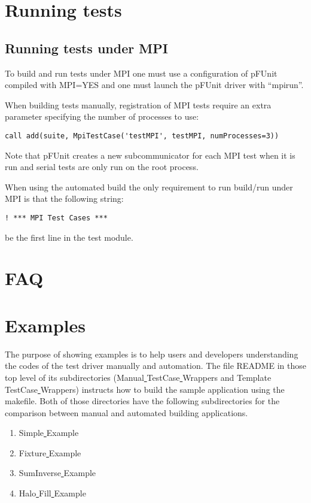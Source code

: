 \documentclass[10pt]{article}
\newcommand{\pfunit}{{\sc pFUnit }}
\begin{document}
\section{Running tests}
\subsection{Running tests under MPI}

To build and run tests under MPI one must use a configuration of
\pfunit compiled with MPI=YES and one must launch the \pfunit driver
with ``mpirun''.

When building tests manually, registration of MPI tests require an
extra parameter specifying the number of processes to use:

\begin{verbatim}
call add(suite, MpiTestCase('testMPI', testMPI, numProcesses=3))
\end{verbatim}

Note that \pfunit creates a new subcommunicator for each MPI test when it is run
and serial tests are only run on the root process. 

When using the automated build the only requirement to run build/run
under MPI is that the following string:

\begin{verbatim}
! *** MPI Test Cases ***
\end{verbatim}

be the first line in the test module.

\section{FAQ}


\section{Examples}
The purpose of showing examples is to help users and developers understanding the codes of the test driver manually and automation.   The file README in those top level of its subdirectories (Manual\underline{ }TestCase\underline{ }Wrappers and Template\underline{ }TestCase\underline{ }Wrappers) instructs how to build the sample application using the makefile.    Both of those directories have the following subdirectories for the comparison between manual and automated building applications.    
\begin{enumerate}
\item Simple\underline{ }Example
\item Fixture\underline{ }Example
\item SumInverse\underline{ }Example
\item Halo\underline{ }Fill\underline{ }Example
\end{enumerate}
\end{document}
